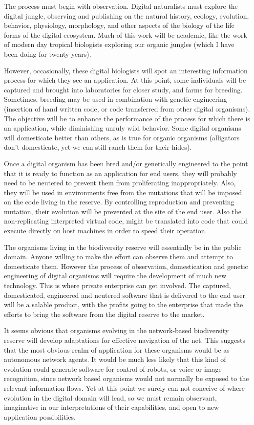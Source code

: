 The process must begin with observation.  Digital naturalists must
explore the digital jungle, observing and publishing on the natural
history, ecology, evolution, behavior, physiology, morphology, and
other aspects of the biology of the life forms of the digital ecosystem.
Much of this work will be academic, like the work of modern day tropical
biologists exploring our organic jungles (which I have been doing for
twenty years).

However, occasionally, these digital biologists will spot an interesting
information process for which they see an application.  At this point,
some individuals will be captured and brought into laboratories for closer
study, and farms for breeding.  Sometimes, breeding may be used in combination
with genetic engineering (insertion of hand written code, or code transferred
from other digital organisms).  The objective will be to enhance the
performance of the process for which there is an application, while
diminishing unruly wild behavior.  Some digital organisms will domesticate
better than others, as is true for organic organisms (alligators don't
domesticate, yet we can still ranch them for their hides).

Once a digital organism has been bred and/or genetically engineered to
the point that it is ready to function as an application for end users,
they will probably need to be neutered to prevent them from proliferating
inappropriately.  Also, they will be used in environments free from the
mutations that will be imposed on the code living in the reserve.
By controlling reproduction and preventing mutation, their evolution
will be prevented at the site of the end user.  Also the non-replicating
interpreted virtual code, might be translated into code that could
execute directly on host machines in order to speed their operation.

The organisms living in the biodiversity reserve will essentially be in
the public domain.  Anyone willing to make the effort can observe them
and attempt to domesticate them.  However the process of observation,
domestication and genetic engineering of digital organisms will require
the development of much new technology.  This is where private enterprise
can get involved.  The captured, domesticated, engineered and neutered
software that is delivered to the end user will be a salable product,
with the profits going to the enterprise that made the efforts to bring
the software from the digital reserve to the market.

It seems obvious that organisms evolving in the network-based biodiversity
reserve will develop adaptations for effective navigation of the net.
This suggests that the most obvious realm of application for these
organisms would be as autonomous network agents.  It would be much less
likely that this kind of evolution could generate software for control
of robots, or voice or image recognition, since network based organisms
would not normally be exposed to the relevant information flows.  Yet
at this point we surely can not conceive of where evolution in the digital
domain will lead, so we must remain observant, imaginative in our
interpretations of their capabilities, and open to new application
possibilities.

